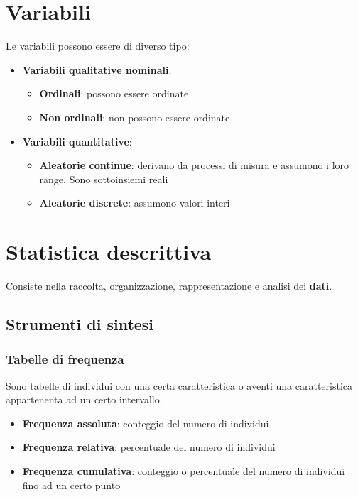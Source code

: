 \documentclass[a4paper]{article}
\theoremstyle{break}
\theoremstyle{break}
\theoremstyle{break}
\theoremstyle{break}
\begin{document}
\section{Variabili}
Le variabili possono essere di diverso tipo:
\begin{itemize}
	\item \textbf{Variabili qualitative nominali}:
	      \begin{itemize}
		      \item \textbf{Ordinali}: possono essere ordinate
		      \item \textbf{Non ordinali}: non possono essere ordinate
	      \end{itemize}
	\item \textbf{Variabili quantitative}:
	      \begin{itemize}
		      \item \textbf{Aleatorie continue}: derivano da processi di misura e assumono
		            i loro range. Sono sottoinsiemi reali
		      \item \textbf{Aleatorie discrete}: assumono valori interi
	      \end{itemize}
\end{itemize}

\section{Statistica descrittiva}
Consiste nella raccolta, organizzazione, rappresentazione e analisi dei \textbf{dati}.

\subsection{Strumenti di sintesi}
\subsubsection{Tabelle di frequenza}
Sono tabelle di individui con una certa caratteristica o aventi una caratteristica
appartenenta ad un certo intervallo.
\begin{itemize}
	\item \textbf{Frequenza assoluta}: conteggio del numero di individui
	\item \textbf{Frequenza relativa}: percentuale del numero di individui
	\item \textbf{Frequenza cumulativa}: conteggio o percentuale del numero di individui
	      fino ad un certo punto
\end{itemize}
\end{document}
